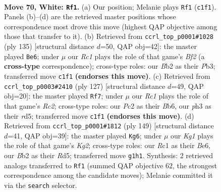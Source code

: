 \documentclass[11pt]{article}
\begin{document}
\clearpage

\begin{figure}[p]\centering
\begin{subfigure}{0.46\textwidth}\centering
\resizebox{\linewidth}{!}{%
\newchessgame
\chessboard[
  setfen={7k/3n4/6P1/8/p1p5/P1P4p/1BP1r2P/2R3K1 w - - 29 70},
  showmover=false,
  pgfstyle=straightmove, color=movearrow, markmove={c1-f1}
]}
\caption{}
\end{subfigure}\hfill
\begin{subfigure}{0.46\textwidth}\centering
\resizebox{\linewidth}{!}{%
\newchessgame
\chessboard[
  setfen={8/2R1pb2/3p1k2/4p2p/4P3/1p3PP1/3K4/8 b - - 8 68},
  showmover=false,
  pgfstyle=straightmove, color=movearrow, markmove={f7-e6}
]}
\caption{}
\end{subfigure}
\\[4pt]
\begin{subfigure}{0.46\textwidth}\centering
\resizebox{\linewidth}{!}{%
\newchessgame
\chessboard[
  setfen={8/p1r3k1/1b2R2p/p2R4/P7/1P6/K7/8 b - - 2 64},
  showmover=false,
  pgfstyle=straightmove, color=movearrow, markmove={c7-f7}
]}
\caption{}
\end{subfigure}\hfill
\begin{subfigure}{0.46\textwidth}\centering
\resizebox{\linewidth}{!}{%
\newchessgame
\chessboard[
  setfen={8/2R2pk1/4b3/3r1p1p/5P1P/6P1/4B3/4K3 b - - 0 75},
  showmover=false,
  pgfstyle=straightmove, color=movearrow, markmove={g7-g6}
]}
\caption{}
\end{subfigure}
\caption{\textbf{Move 70, White: \texttt{Rf1}.} (a) Our position; Melanie plays \texttt{Rf1} (\texttt{c1f1}). Panels (b)--(d) are the retrieved master positions whose correspondence most drove this move (highest QAP objective among those that transfer to it). (b) Retrieved from \texttt{ccrl\_top\_p0001\#1028} (ply 135) [structural distance $d$=50, QAP obj=42]: the master played \texttt{Be6}; under $\mu$ our \emph{Rc1} plays the role of that game's \emph{Bf2} (a \textbf{cross-type} correspondence); cross-type roles: our \emph{B}b2 as their \emph{P}b3; transferred move \texttt{c1f1} \textbf{(endorses this move)}. (c) Retrieved from \texttt{ccrl\_top\_p0003\#2410} (ply 127) [structural distance $d$=49, QAP obj=20]: the master played \texttt{Rf7}; under $\mu$ our \emph{Rc1} plays the role of that game's \emph{Rc2}; cross-type roles: our \emph{P}c2 as their \emph{B}b6, our \emph{p}h3 as their \emph{r}d5; transferred move \texttt{c1f1} \textbf{(endorses this move)}. (d) Retrieved from \texttt{ccrl\_top\_p0001\#1812} (ply 149) [structural distance $d$=41, QAP obj=39]: the master played \texttt{Kg6}; under $\mu$ our \emph{Kg1} plays the role of that game's \emph{Kg2}; cross-type roles: our \emph{R}c1 as their \emph{B}e6, our \emph{B}b2 as their \emph{R}d5; transferred move \texttt{g1h1}. Synthesis: 2 retrieved analogs transferred to \texttt{Rf1} (summed QAP objective 62, the strongest correspondence among the candidate moves); Melanie committed it via the \texttt{search} selector.}
\label{fig:thought-m138}
\end{figure}
\end{document}
